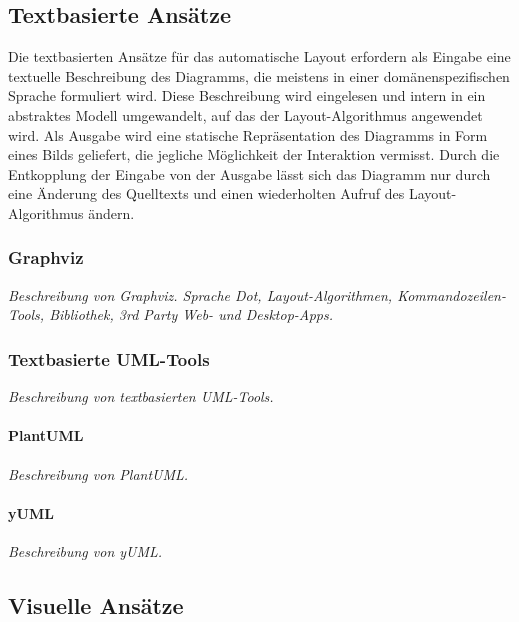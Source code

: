 \subsection{Textbasierte Ansätze}

Die textbasierten Ansätze für das automatische Layout erfordern als Eingabe eine textuelle Beschreibung des Diagramms, die meistens in einer domänenspezifischen Sprache formuliert wird. Diese Beschreibung wird eingelesen und intern in ein abstraktes Modell umgewandelt, auf das der Layout-Algorithmus angewendet wird. Als Ausgabe wird eine statische Repräsentation des Diagramms in Form eines Bilds geliefert, die jegliche Möglichkeit der Interaktion vermisst. Durch die Entkopplung der Eingabe von der Ausgabe lässt sich das Diagramm nur durch eine Änderung des Quelltexts und einen wiederholten Aufruf des Layout-Algorithmus ändern.


\subsubsection{Graphviz}

\textit{Beschreibung von Graphviz. Sprache Dot, Layout-Algorithmen, Kommandozeilen-Tools, Bibliothek, 3rd Party Web- und Desktop-Apps.}


\subsubsection{Textbasierte UML-Tools}

\textit{Beschreibung von textbasierten UML-Tools.}

\paragraph{PlantUML}

\textit{Beschreibung von PlantUML.}

\paragraph{yUML}

\textit{Beschreibung von yUML.}


\subsection{Visuelle Ansätze}
\label{subsec:visual-approaches}

